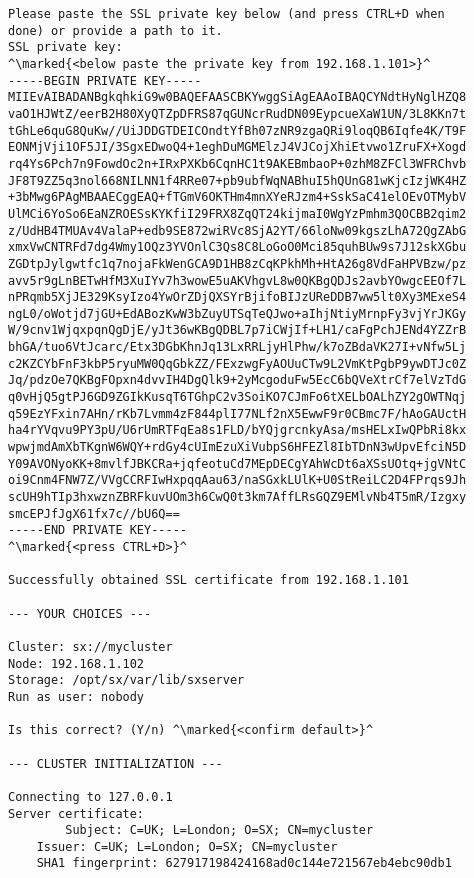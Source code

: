 \begin{lstlisting}
Please paste the SSL private key below (and press CTRL+D when
done) or provide a path to it.
SSL private key:
^\marked{<below paste the private key from 192.168.1.101>}^
-----BEGIN PRIVATE KEY-----
MIIEvAIBADANBgkqhkiG9w0BAQEFAASCBKYwggSiAgEAAoIBAQCYNdtHyNglHZQ8
vaO1HJWtZ/eerB2H80XyQTZpDFRS87qGUNcrRudDN09EypcueXaW1UN/3L8KKn7t
tGhLe6quG8QuKw//UiJDDGTDEICOndtYfBh07zNR9zgaQRi9loqQB6Iqfe4K/T9F
EONMjVji1OF5JI/3SgxEDwoQ4+1eghDuMGMElzJ4VJCojXhiEtvwo1ZruFX+Xogd
rq4Ys6Pch7n9FowdOc2n+IRxPXKb6CqnHC1t9AKEBmbaoP+0zhM8ZFCl3WFRChvb
JF8T9ZZ5q3nol668NILNN1f4RRe07+pb9ubfWqNABhuI5hQUnG81wKjcIzjWK4HZ
+3bMwg6PAgMBAAECggEAQ+fTGmV6OKTHm4mnXYeRJzm4+SskSaC41elOEvOTMybV
UlMCi6YoSo6EaNZROESsKYKfiI29FRX8ZqQT24kijmaI0WgYzPmhm3QOCBB2qim2
z/UdHB4TMUAv4ValaP+edb9SE872wiRVc8SjA2YT/66loNw09kgszLhA72QgZAbG
xmxVwCNTRFd7dg4Wmy1OQz3YVOnlC3Qs8C8LoGoO0Mci85quhBUw9s7J12skXGbu
ZGDtpJylgwtfc1q7nojaFkWenGCA9D1HB8zCqKPkhMh+HtA26g8VdFaHPVBzw/pz
avv5r9gLnBETwHfM3XuIYv7h3wowE5uAKVhgvL8w0QKBgQDJs2avbYOwgcEEOf7L
nPRqmb5XjJE329KsyIzo4YwOrZDjQXSYrBjifoBIJzUReDDB7ww5lt0Xy3MExeS4
ngL0/oWotjd7jGU+EdABozKwW3bZuyUTSqTeQJwo+aIhjNtiyMrnpFy3vjYrJKGy
W/9cnv1WjqxpqnQgDjE/yJt36wKBgQDBL7p7iCWjIf+LH1/caFgPchJENd4YZZrB
bhGA/tuo6VtJcarc/Etx3DGbKhnJq13LxRRLjyHlPhw/k7oZBdaVK27I+vNfw5Lj
c2KZCYbFnF3kbP5ryuMW0QqGbkZZ/FExzwgFyAOUuCTw9L2VmKtPgbP9ywDTJc0Z
Jq/pdzOe7QKBgFOpxn4dvvIH4DgQlk9+2yMcgoduFw5EcC6bQVeXtrCf7elVzTdG
q0vHjQ5gtPJ6GD9ZGIkKusqT6TGhpC2v3SoiKO7CJmFo6tXELbOALhZY2gOWTNqj
q59EzYFxin7AHn/rKb7Lvmm4zF844plI77NLf2nX5EwwF9r0CBmc7F/hAoGAUctH
ha4rYVqvu9PY3pU/U6rUmRTFqEa8s1FLD/bYQjgrcnkyAsa/msHELxIwQPbRi8kx
wpwjmdAmXbTKgnW6WQY+rdGy4cUImEzuXiVubpS6HFEZl8IbTDnN3wUpvEfciN5D
Y09AVONyoKK+8mvlfJBKCRa+jqfeotuCd7MEpDECgYAhWcDt6aXSsUOtq+jgVNtC
oi9Cnm4FNW7Z/VVgCCRFIwHxpqqAau63/naSGxkLUlK+U0StReiLC2D4FPrqs9Jh
scUH9hTIp3hxwznZBRFkuvUOm3h6CwQ0t3km7AffLRsGQZ9EMlvNb4T5mR/Izgxy
smcEPJfJgX61fx7c//bU6Q==
-----END PRIVATE KEY-----
^\marked{<press CTRL+D>}^

Successfully obtained SSL certificate from 192.168.1.101

--- YOUR CHOICES ---

Cluster: sx://mycluster
Node: 192.168.1.102
Storage: /opt/sx/var/lib/sxserver
Run as user: nobody

Is this correct? (Y/n) ^\marked{<confirm default>}^

--- CLUSTER INITIALIZATION ---

Connecting to 127.0.0.1
Server certificate:
        Subject: C=UK; L=London; O=SX; CN=mycluster
	Issuer: C=UK; L=London; O=SX; CN=mycluster
	SHA1 fingerprint: 627917198424168ad0c144e721567eb4ebc90db1


\end{lstlisting}
